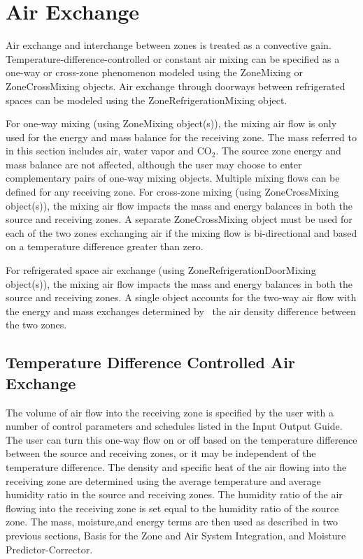 \section{Air Exchange}\label{air-exchange}

Air exchange and interchange between zones is treated as a convective gain. Temperature-difference-controlled or constant air mixing can be specified as a one-way or cross-zone phenomenon modeled using the ZoneMixing or ZoneCrossMixing objects. Air exchange through doorways between refrigerated spaces can be modeled using the ZoneRefrigerationMixing object.

For one-way mixing (using ZoneMixing object(s)), the mixing air flow is only used for the energy and mass balance for the receiving zone. The mass referred to in this section includes air, water vapor and CO\(_{2}\). The source zone energy and mass balance are not affected, although the user may choose to enter complementary pairs of one-way mixing objects. Multiple mixing flows can be defined for any receiving zone. For cross-zone mixing (using ZoneCrossMixing object(s)), the mixing air flow impacts the mass and energy balances in both the source and receiving zones. A separate ZoneCrossMixing object must be used for each of the two zones exchanging air if the mixing flow is bi-directional and based on a temperature difference greater than zero.

For refrigerated space air exchange (using ZoneRefrigerationDoorMixing object(s)), the mixing air flow impacts the mass and energy balances in both the source and receiving zones. A single object accounts for the two-way air flow with the energy and mass exchanges determined by~ the air density difference between the two zones.

\subsection{Temperature Difference Controlled Air Exchange}\label{temperature-difference-controlled-air-exchange}

The volume of air flow into the receiving zone is specified by the user with a number of control parameters and schedules listed in the Input Output Guide. The user can turn this one-way flow on or off based on the temperature difference between the source and receiving zones, or it may be independent of the temperature difference. The density and specific heat of the air flowing into the receiving zone are determined using the average temperature and average humidity ratio in the source and receiving zones. The humidity ratio of the air flowing into the receiving zone is set equal to the humidity ratio of the source zone. The mass, moisture,and energy terms are then used as described in two previous sections, Basis for the Zone and Air System Integration, and Moisture Predictor-Corrector.

